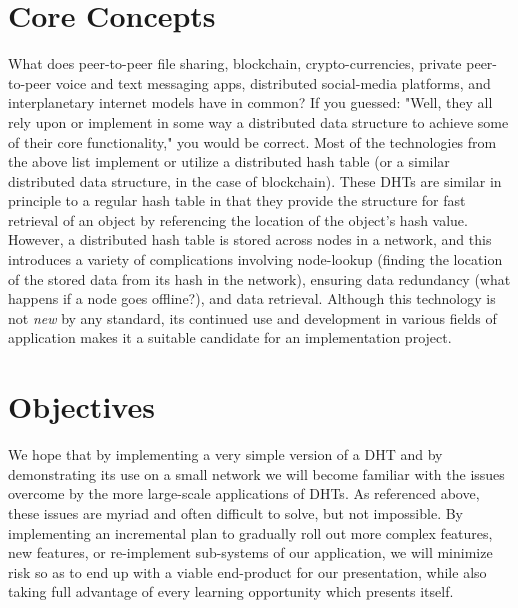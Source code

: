 \documentclass[12pt]{article}
\begin{document}
    \section{Core Concepts}
    What does peer-to-peer file sharing\cite{bittorrent-wiki}, blockchain,
    crypto-currencies\cite{ethereum-rlp}, private peer-to-peer voice and text
    messaging apps\cite{tox-site}, distributed social-media
    platforms\cite{distributed-social-networks}, and interplanetary internet
    models\cite{ipfs-site} have in common?  If you guessed: "Well, they all rely
    upon or implement in some way a distributed data structure to achieve some
    of their core functionality," you would be correct.  Most of the
    technologies from the above list implement or utilize a distributed hash
    table (or a similar distributed data structure, in the case of blockchain).
    These DHTs are similar in principle to a regular hash table in that they
    provide the structure for fast retrieval of an object by referencing the
    location of the object's hash value.  However, a distributed hash table is
    stored across nodes in a network, and this introduces a variety of
    complications involving node-lookup (finding the location of the stored data
    from its hash in the network), ensuring data redundancy (what happens if a
    node goes offline?), and data retrieval.  Although this technology is not
    \textit{new} by any standard, its continued use and development in various
    fields of application makes it a suitable candidate for an implementation
    project.
    
    \section{Objectives}
    We hope that by implementing a very simple version of a DHT and by demonstrating
    its use on a small network we will become familiar with the issues
    overcome by the more large-scale applications of DHTs.  As referenced above,
    these issues are myriad and often difficult to solve, but not impossible.
    By implementing an incremental plan to gradually roll out more complex features, new
    features, or re-implement sub-systems of our application, we will minimize
    risk so as to end up with a viable end-product for our presentation, while
    also taking full advantage of every learning opportunity which presents
    itself.
\end{document}

